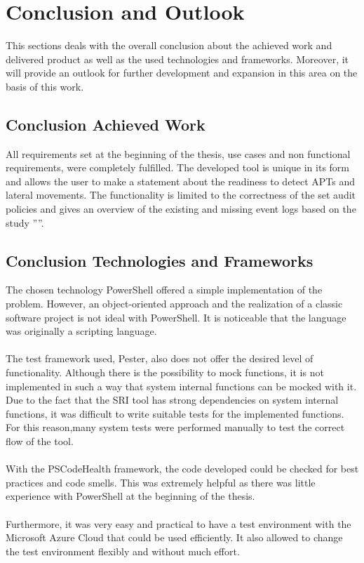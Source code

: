 \section{Conclusion and Outlook}
This sections deals with the overall conclusion about the achieved work and delivered product as well as the used technologies and frameworks. Moreover, it will provide an outlook for further development and expansion in this area on the basis of this work.

\subsection{Conclusion Achieved Work}
All requirements set at the beginning of the thesis, use cases and non functional requirements, were completely fulfilled. The developed tool is unique in its form and allows the user to make a statement about the readiness to detect APTs and lateral movements. The functionality is limited to the correctness of the set audit policies and gives an overview of the existing and missing event logs based on the study ''''.

\subsection{Conclusion Technologies and Frameworks}
The chosen technology PowerShell offered a simple implementation of the problem. However, an object-oriented approach and the realization of a classic software project is not ideal with PowerShell. It is noticeable that the language was originally a scripting language.
\\\\
The test framework used, Pester, also does not offer the desired level of functionality. Although there is the possibility to mock functions, it is not implemented in such a way that system internal functions can be mocked with it. Due to the fact that the SRI tool has strong dependencies on system internal functions, it was difficult to write suitable tests for the implemented functions. For this reason,many system tests were performed manually to test the correct flow of the tool.
\\\\
With the PSCodeHealth framework, the code developed could be checked for best practices and code smells. This was extremely helpful as there was little experience with PowerShell at the beginning of the thesis. 
\\\\
Furthermore, it was very easy and practical to have a test environment with the Microsoft Azure Cloud that could be used efficiently. It also allowed to change the test environment flexibly and without much effort.

